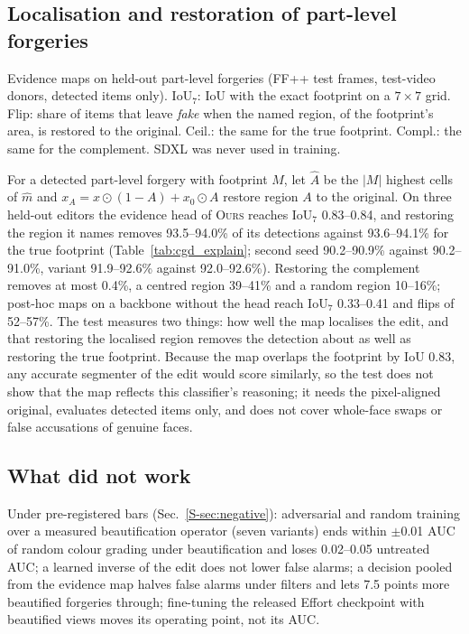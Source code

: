 \documentclass[conference]{IEEEtran}
\newcommand{\ours}{\textsc{Ours}}
\begin{document}
\subsection{Localisation and restoration of part-level forgeries}
\label{sec:cgd}
\begin{table}[t]
\centering
\caption{Evidence maps on held-out part-level forgeries (FF++ test frames, test-video donors, detected items only). IoU$_7$:
IoU with the exact footprint on a $7\times7$ grid. Flip: share of items that leave \emph{fake} when the named region, of the
footprint's area, is restored to the original. Ceil.: the same for the true footprint. Compl.: the same for the complement.
SDXL was never used in training.}
\label{tab:cgd_explain}
\footnotesize
\begin{adjustbox}{max width=\textwidth}\end{adjustbox}
\end{table}
For a detected part-level forgery with footprint $M$, let $\hat A$ be the $|M|$ highest cells of $\hat m$ and
$x_A=x\odot(1-A)+x_0\odot A$ restore region $A$ to the original. On three held-out editors the evidence head of \ours{} reaches
IoU$_7$ 0.83--0.84, and restoring the region it names removes 93.5--94.0\% of its detections against 93.6--94.1\% for the true
footprint (Table~\ref{tab:cgd_explain}; second seed 90.2--90.9\% against 90.2--91.0\%, variant 91.9--92.6\% against
92.0--92.6\%). Restoring the complement removes at most 0.4\%, a centred region 39--41\% and a random region 10--16\%; post-hoc
maps on a backbone without the head reach IoU$_7$ 0.33--0.41 and flips of 52--57\%. The test measures two things: how well the
map localises the edit, and that restoring the localised region removes the detection about as well as restoring the true
footprint. Because the map overlaps the footprint by IoU 0.83, any accurate segmenter of the edit would score similarly, so the
test does not show that the map reflects this classifier's reasoning; it needs the pixel-aligned original, evaluates detected
items only, and does not cover whole-face swaps or false accusations of genuine faces.

\subsection{What did not work}
\label{sec:negative}
Under pre-registered bars (Sec.~\ref{S-sec:negative}): adversarial and random training over a measured beautification operator
(seven variants) ends within $\pm$0.01 AUC of random colour grading under beautification and loses 0.02--0.05 untreated AUC; a
learned inverse of the edit does not lower false alarms; a decision pooled from the evidence map halves false alarms under
filters and lets 7.5 points more beautified forgeries through; fine-tuning the released Effort checkpoint with beautified views
moves its operating point, not its AUC.
\end{document}
